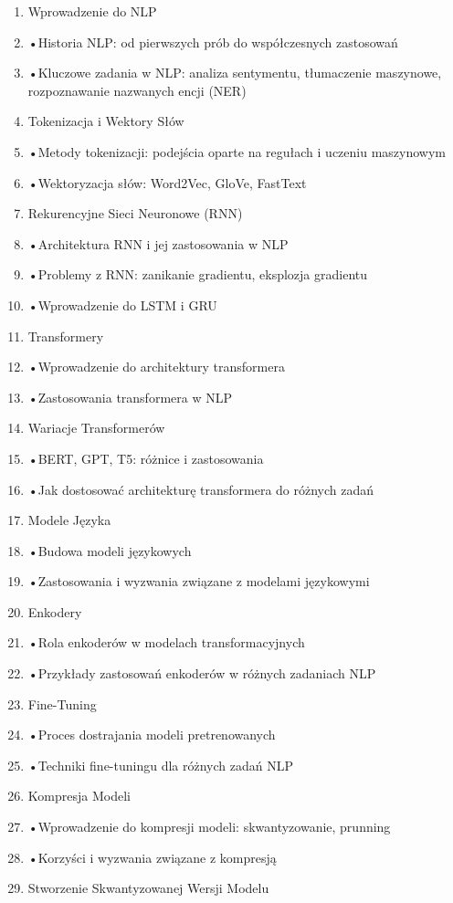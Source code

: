 \documentclass[12pt, a4paper]{article}
\begin{document}
\begin{enumerate}
  \item Wprowadzenie do NLP
  \item •Historia NLP: od pierwszych prób do współczesnych zastosowań
  \item •Kluczowe zadania w NLP: analiza sentymentu, tłumaczenie maszynowe, rozpoznawanie nazwanych encji (NER)
  \item Tokenizacja i Wektory Słów
  \item •Metody tokenizacji: podejścia oparte na regułach i uczeniu maszynowym
  \item •Wektoryzacja słów: Word2Vec, GloVe, FastText
  \item Rekurencyjne Sieci Neuronowe (RNN)
  \item •Architektura RNN i jej zastosowania w NLP
  \item •Problemy z RNN: zanikanie gradientu, eksplozja gradientu
  \item •Wprowadzenie do LSTM i GRU
  \item Transformery
  \item •Wprowadzenie do architektury transformera
  \item •Zastosowania transformera w NLP
  \item Wariacje Transformerów
  \item •BERT, GPT, T5: różnice i zastosowania
  \item •Jak dostosować architekturę transformera do różnych zadań
  \item Modele Języka
  \item •Budowa modeli językowych
  \item •Zastosowania i wyzwania związane z modelami językowymi
  \item Enkodery
  \item •Rola enkoderów w modelach transformacyjnych
  \item •Przykłady zastosowań enkoderów w różnych zadaniach NLP
  \item Fine-Tuning
  \item •Proces dostrajania modeli pretrenowanych
  \item •Techniki fine-tuningu dla różnych zadań NLP
  \item Kompresja Modeli
  \item •Wprowadzenie do kompresji modeli: skwantyzowanie, prunning
  \item •Korzyści i wyzwania związane z kompresją
  \item Stworzenie Skwantyzowanej Wersji Modelu

\end{enumerate}
\end{document}
